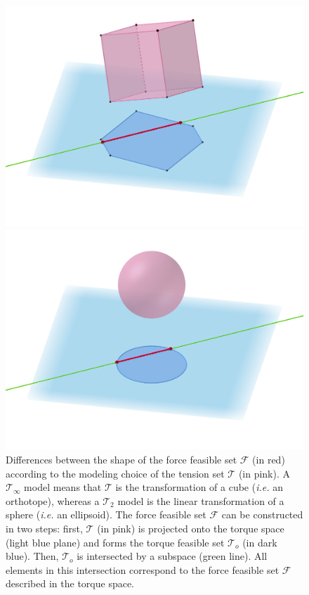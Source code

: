 \begin{figure}[!htb]
    \centering
    \captionsetup{justification=centering}
    \begin{minipage}{0.49\linewidth}
        \centering
        \includegraphics[trim={50 150 50 70}, clip, width=1\linewidth]{img/chapter_3/polytope_better_ggb.png}
    \end{minipage}
    \hfill
    \begin{minipage}{0.49\linewidth}
        \captionsetup{justification=centering}
        \centering
        \includegraphics[trim={50 150 50 70}, clip, width=1\linewidth]{img/chapter_3/polytope_from_sphere_ggb.png}
    \end{minipage}
    \caption{Differences between the shape of the force feasible set $\mathcal{F}$ (in red) according to the modeling choice of the tension set $\mathcal{T}$ (in pink). A $\mathcal{T}_{\infty}$ model means that $\mathcal{T}$ is the transformation of a cube (\emph{i.e.} an orthotope), whereas a $\mathcal{T}_2$ model is the linear transformation of a sphere (\emph{i.e.} an ellipsoid). The force feasible set $\mathcal{F}$ can be constructed in two steps: first, $\mathcal{T}$ (in pink) is projected onto the torque space (light blue plane) and forms the torque feasible set $\mathcal{T}_o$ (in dark blue). Then, $\mathcal{T}_o$ is intersected by a subspace (green line). All elements in this intersection correspond to the force feasible set $\mathcal{F}$ described in the torque space.}

\end{figure}
